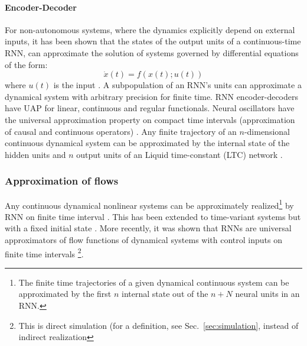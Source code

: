 \documentclass{article}
\theoremstyle{definition}
\theoremstyle{remark}
\newcommand{\reals}{\mathbb{R}}
\newcounter{ct}
\begin{document}
\paragraph{Encoder-Decoder}
For non-autonomous systems, where the dynamics explicitly depend on external inputs, it has been shown that the states of the output units of a continuous-time RNN, can approximate the solution of systems governed by differential equations of the form:
\[
\dot{x}(t) = f(x(t); u(t)) 
\]
where $u(t)$ is the input \citep{garces2012strategies}. %
A subpopulation of an RNN's units can approximate a dynamical system with arbitrary precision for finite time\citep{kambhampati2000approximation}. %
RNN encoder-decoders have UAP for linear, continuous and regular functionals\citep{li2021approximationencdec}.
Neural oscillators have the universal approximation property on compact time intervals (approximation of causal and continuous operators) \citep{lanthaler2023neuraloscillators}.
%
Any finite trajectory of an $n$-dimensional continuous dynamical system can be approximated by the internal state of the hidden units and $n$ output units of an Liquid time-constant (LTC) network \citep{hasani2018liquid}.


\subsubsection{Approximation of flows}%
Any continuous dynamical nonlinear systems can be approximately realized\footnote{The finite time trajectories of a given dynamical continuous system can be approximated by the first $n$ internal state out of the $n + N$ neural units in an RNN.} by RNN on finite time interval \citep{chow2000modeling}.
%
This has been extended to time-variant systems but with a fixed initial state \citep{li2005approximation}. %
%
More recently, it was shown that RNNs are universal approximators of flow functions of dynamical systems  with control inputs on finite time intervals  \citep{aguiar2023universal}\footnote{This is direct simulation (for a definition, see Sec.~\ref{sec:simulation}, instead of indirect realization}. %
\end{document}
